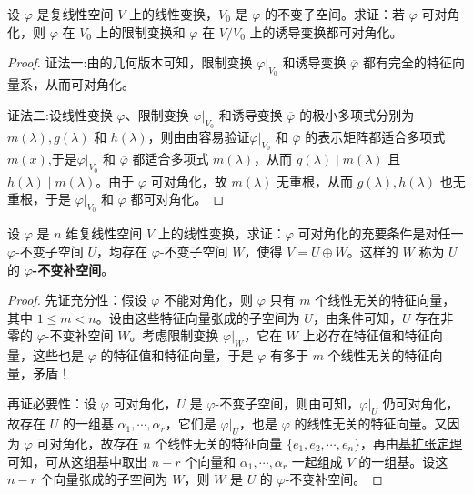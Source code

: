 \documentclass[../../main.tex]{subfiles}
\begin{document}
\begin{proposition}\label{proposition:可对角化的线性变换其限制变换和诱导变换也可对角化}
设 $\varphi$ 是复线性空间 $V$ 上的线性变换，$V_0$ 是 $\varphi$ 的不变子空间。求证：若 $\varphi$ 可对角化，则 $\varphi$ 在 $V_0$ 上的限制变换和 $\varphi$ 在 $V/V_0$ 上的诱导变换都可对角化。
\end{proposition}
\begin{proof}
{\color{blue}证法一:}由的几何版本可知，限制变换 $\varphi|_{V_0}$ 和诱导变换 $\overline{\varphi}$ 都有完全的特征向量系，从而可对角化。

{\color{blue}证法二:}设线性变换 $\varphi$、限制变换 $\varphi|_{V_0}$ 和诱导变换 $\overline{\varphi}$ 的极小多项式分别为 $m(\lambda),g(\lambda)$ 和 $h(\lambda)$，则由由容易验证$\varphi|_{V_0}$ 和 $\overline{\varphi}$ 的表示矩阵都适合多项式$m(x)$,于是$\varphi|_{V_0}$ 和 $\overline{\varphi}$ 都适合多项式 $m(\lambda)$，从而 $g(\lambda)\mid m(\lambda)$ 且 $h(\lambda)\mid m(\lambda)$。由于 $\varphi$ 可对角化，故 $m(\lambda)$ 无重根，从而 $g(\lambda),h(\lambda)$ 也无重根，于是 $\varphi|_{V_0}$ 和 $\overline{\varphi}$ 都可对角化。
\end{proof}

\begin{proposition}\label{proposition:线性变换可对角化的关于不变子空间的充要条件}
设 $\varphi$ 是 $n$ 维复线性空间 $V$ 上的线性变换，求证：$\varphi$ 可对角化的充要条件是对任一 $\varphi$-不变子空间 $U$，均存在 $\varphi$-不变子空间 $W$，使得 $V = U\oplus W$。这样的 $W$ 称为 $U$ 的 \textbf{$\varphi$-不变补空间}。
\end{proposition}
\begin{proof}
{\heiti 先证充分性：}假设 $\varphi$ 不能对角化，则 $\varphi$ 只有 $m$ 个线性无关的特征向量，其中 $1\leq m < n$。设由这些特征向量张成的子空间为 $U$，由条件可知，$U$ 存在非零的 $\varphi$-不变补空间 $W$。考虑限制变换 $\varphi|_W$，它在 $W$ 上必存在特征值和特征向量，这些也是 $\varphi$ 的特征值和特征向量，于是 $\varphi$ 有多于 $m$ 个线性无关的特征向量，矛盾！

{\heiti 再证必要性：}设 $\varphi$ 可对角化，$U$ 是 $\varphi$-不变子空间，则由可知，$\varphi|_U$ 仍可对角化，故存在 $U$ 的一组基 $\alpha_1,\cdots,\alpha_r$，它们是 $\varphi|_U$，也是 $\varphi$ 的线性无关的特征向量。又因为 $\varphi$ 可对角化，故存在 $n$ 个线性无关的特征向量 $\{e_1,e_2,\cdots,e_n\}$，再由\hyperref[theorem:基扩张定理]{基扩张定理}可知，可从这组基中取出 $n - r$ 个向量和 $\alpha_1,\cdots,\alpha_r$ 一起组成 $V$ 的一组基。设这 $n - r$ 个向量张成的子空间为 $W$，则 $W$ 是 $U$ 的 $\varphi$-不变补空间。
\end{proof}
\end{document}
